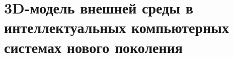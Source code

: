 \chapter{3D-модель внешней среды в интеллектуальных компьютерных системах нового поколения}
\label{chapter_3d_models}


%